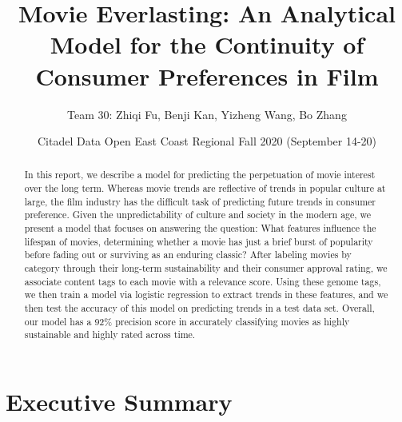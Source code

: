 \documentclass[12pt]{article}
\begin{document}
\begin{titlepage}
\title{Movie Everlasting: An Analytical Model for the Continuity of Consumer Preferences in Film}
\author{Team 30: Zhiqi Fu,  Benji Kan, Yizheng Wang, Bo Zhang}
\date{Citadel Data Open East Coast Regional Fall 2020 (September 14-20)} %
\maketitle

\begin{abstract}
    In this report, we describe a model for predicting the perpetuation of movie interest over the long term. Whereas movie trends are reflective of trends in popular culture at large, the film industry has the difficult task of predicting future trends in consumer preference. Given the unpredictability of culture and society in the modern age, we present a model that focuses on answering the question: What features influence the lifespan of movies, determining whether a movie has just a brief burst of popularity before fading out or surviving as an enduring classic? After labeling movies by category through their long-term sustainability and their consumer approval rating, we associate content tags to each movie with a relevance score. Using these genome tags, we then train a model via logistic regression to extract trends in these features, and we then test the accuracy of this model on predicting trends in a test data set. Overall, our model has a 92\% precision score in accurately classifying movies as highly sustainable and highly rated across time.
    
\end{abstract}


\tableofcontents
\end{titlepage}

\newpage

\doublespacing
\section{Executive Summary}

\end{document}
